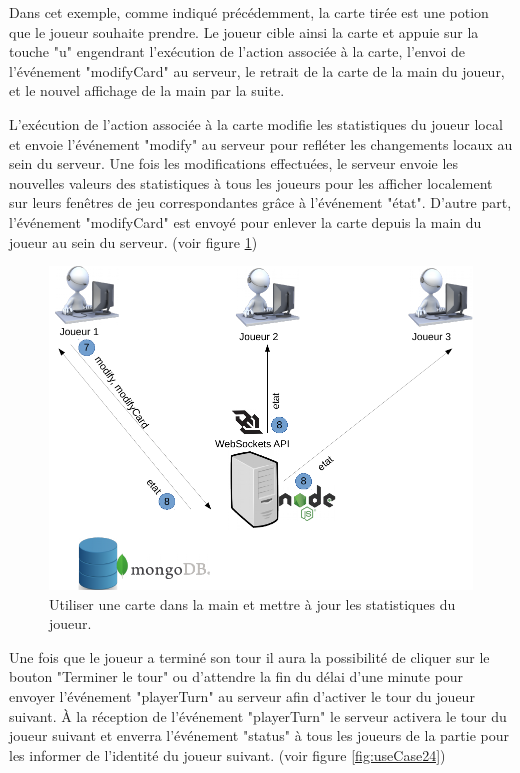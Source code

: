 \documentclass[12pt]{report}
\begin{document}
			Dans cet exemple, comme indiqué précédemment, la carte tirée est une potion que le joueur souhaite prendre. Le joueur cible ainsi la carte et appuie sur la touche "u" engendrant l'exécution de l'action associée à la carte, l'envoi de l'événement "modifyCard" au serveur, le retrait de la carte de la main du joueur, et le nouvel affichage de la main par la suite.

			L'exécution de l'action associée à la carte modifie les statistiques du joueur local et envoie l'événement "modify" au serveur pour refléter les changements locaux au sein du serveur. Une fois les modifications effectuées, le serveur envoie les nouvelles valeurs des statistiques à tous les joueurs pour les afficher localement sur leurs fenêtres de jeu correspondantes grâce à l'événement "état". D'autre part, l'événement "modifyCard" est envoyé pour enlever la carte depuis la main du joueur au sein du serveur. (voir figure \ref{fig:useCase23})

			\begin{figure}[h!]
		  	\centering
		    \includegraphics[scale=0.5]{images/useCase23.png}
		    \caption{Utiliser une carte dans la main et mettre à jour les statistiques du joueur.}
				\label{fig:useCase23}
		  \end{figure}

			Une fois que le joueur a terminé son tour il aura la possibilité de cliquer sur le bouton "Terminer le tour" ou d'attendre la fin du délai d'une minute pour envoyer l'événement "playerTurn" au serveur afin d'activer le tour du joueur suivant. À la réception de l'événement "playerTurn" le serveur activera le tour du joueur suivant et enverra l'événement "status" à tous les joueurs de la partie pour les informer de l'identité du joueur suivant. (voir figure \ref{fig:useCase24})
\end{document}
